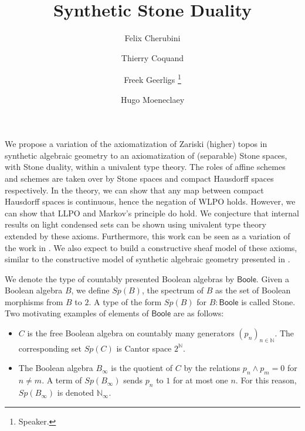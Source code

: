 \documentclass[letterpaper]{../../util/easychair}
\title{Synthetic Stone Duality 
}
\author{
Felix Cherubini %
\and 
 Thierry Coquand%
\and 
 Freek Geerligs%
\thanks{Speaker.}%
\and
 Hugo Moeneclaey %
}
\institute{
  University of Gothenburg and Chalmers University of Technology, Gothenburg, Sweden%
}
\newcommand{\N}{\mathbb{N}}
\newcommand{\Boole}{\mathsf{Boole}}
\newcommand{\Noo}{\N_{\infty}}
\begin{document}
\maketitle
We propose a variation of the axiomatization of Zariski (higher) topos in synthetic algebraic geometry \cite{draft}
to an axiomatization of (separable) Stone spaces, with Stone duality, within a univalent type theory.  
The roles of affine schemes and schemes are taken over by Stone spaces and compact Hausdorff spaces respectively. 
In the theory, we can show that any map between compact Hausdorff spaces is continuous, hence the negation of WLPO holds. 
However, we can show that LLPO and Markov's principle do hold. 
We conjecture that internal results on light condensed sets \cite{Dagur,Scholze,Condensed} can be shown using univalent
type theory extended by these axioms.
Furthermore, this work can be seen as a variation of the work in \cite{XuE13}. We also expect to build a constructive
sheaf model of these axioms, similar to the constructive model of synthetic algebraic geometry presented in \cite{draft}.

\medskip

We denote the type of countably presented Boolean algebras by $\Boole$.
Given a Boolean algebra $B$, we define $Sp(B)$, the spectrum of $B$ as the set of Boolean morphisms from $B$ to $2$.  
A type of the form $Sp(B)$ for $B:\Boole$ is called Stone.
%
Two motivating examples of elements of $\Boole$ are as follows:
 \begin{itemize}
   \item $C$ is the free Boolean algebra on countably many generators $(p_n)_{n\in\mathbb N}$. 
     The corresponding set $Sp(C)$ is Cantor space $2^\mathbb N$. 
   \item 
     The Boolean algebra $ B_\infty$ is %
     the quotient of $C$ by the relations $p_n\wedge p_m = 0$ for $n\neq m$.  
     A term of $Sp(B_\infty)$ sends $p_n$ to $1$ for at most one $n$. 
     For this reason, $Sp(B_\infty)$ is denoted $\Noo$. 
  \end{itemize} 
\end{document}
